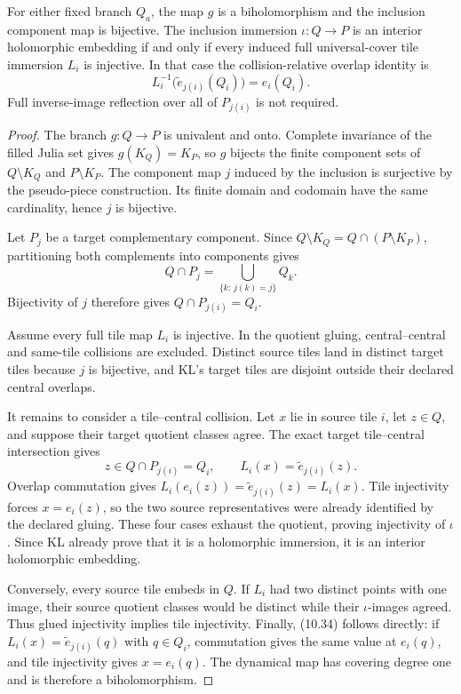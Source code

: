 \begin{theorem}\label{thm:glue-criterion}
For either fixed branch \(Q_a\), the map \(g\) is a biholomorphism and the inclusion component map is bijective. The inclusion immersion \(\iota:Q\to P\) is an interior holomorphic embedding if and only if every induced full universal-cover tile immersion \(L_i\) is injective. In that case the collision-relative overlap identity is
\[
L_i^{-1}\bigl(\tilde e_{j(i)}(Q_i)\bigr)=e_i(Q_i). \tag{10.34}
\]
Full inverse-image reflection over all of \(P_{j(i)}\) is not required.
\end{theorem}

\begin{proof}
The branch \(g:Q\to P\) is univalent and onto. Complete invariance of the filled Julia set gives \(g(K_Q)=K_P\), so \(g\) bijects the finite component sets of \(Q\setminus K_Q\) and \(P\setminus K_P\). The component map \(j\) induced by the inclusion is surjective by the pseudo-piece construction. Its finite domain and codomain have the same cardinality, hence \(j\) is bijective.

Let \(P_j\) be a target complementary component. Since \(Q\setminus K_Q=Q\cap(P\setminus K_P)\), partitioning both complements into components gives
\[
Q\cap P_j=\bigcup_{\{k:\,j(k)=j\}}Q_k .
\]
Bijectivity of \(j\) therefore gives \(Q\cap P_{j(i)}=Q_i\).

Assume every full tile map \(L_i\) is injective. In the quotient gluing, central--central and same-tile collisions are excluded. Distinct source tiles land in distinct target tiles because \(j\) is bijective, and KL's target tiles are disjoint outside their declared central overlaps.

It remains to consider a tile--central collision. Let \(x\) lie in source tile \(i\), let \(z\in Q\), and suppose their target quotient classes agree. The exact target tile--central intersection gives
\[
z\in Q\cap P_{j(i)}=Q_i,\qquad L_i(x)=\tilde e_{j(i)}(z).
\]
Overlap commutation gives \(L_i(e_i(z))=\tilde e_{j(i)}(z)=L_i(x)\). Tile injectivity forces \(x=e_i(z)\), so the two source representatives were already identified by the declared gluing. These four cases exhaust the quotient, proving injectivity of \(\iota\). Since KL already prove that it is a holomorphic immersion, it is an interior holomorphic embedding.

Conversely, every source tile embeds in \(Q\). If \(L_i\) had two distinct points with one image, their source quotient classes would be distinct while their \(\iota\)-images agreed. Thus glued injectivity implies tile injectivity. Finally, (10.34) follows directly: if \(L_i(x)=\tilde e_{j(i)}(q)\) with \(q\in Q_i\), commutation gives the same value at \(e_i(q)\), and tile injectivity gives \(x=e_i(q)\). The dynamical map has covering degree one and is therefore a biholomorphism.
\end{proof}